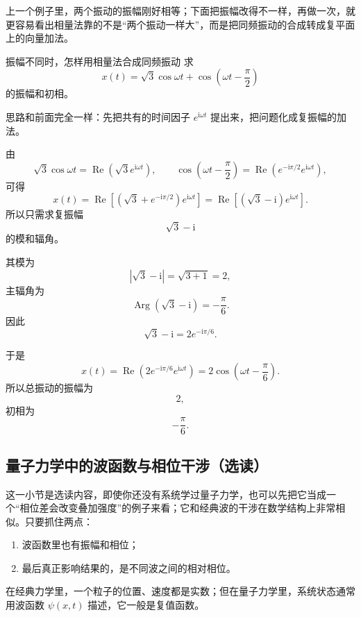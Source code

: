 \noindent 上一个例子里，两个振动的振幅刚好相等；下面把振幅改得不一样，再做一次，就更容易看出相量法靠的不是``两个振动一样大''，而是把同频振动的合成转成复平面上的向量加法。

\begin{lizi}{振幅不同时，怎样用相量法合成同频振动}{}
求
\[
x(t)=\sqrt{3}\cos\omega t+\cos\left(\omega t-\frac{\pi}{2}\right)
\]
的振幅和初相。

\begin{jie}
思路和前面完全一样：先把共有的时间因子 $e^{\mathrm{i}\omega t}$ 提出来，把问题化成复振幅的加法。

由
\[
\sqrt{3}\cos\omega t=\operatorname{Re}\left(\sqrt{3}e^{\mathrm{i}\omega t}\right),\qquad
\cos\left(\omega t-\frac{\pi}{2}\right)=\operatorname{Re}\left(e^{-\mathrm{i}\pi/2}e^{\mathrm{i}\omega t}\right),
\]
可得
\[
x(t)=\operatorname{Re}\left[\left(\sqrt{3}+e^{-\mathrm{i}\pi/2}\right)e^{\mathrm{i}\omega t}\right]
=\operatorname{Re}\left[(\sqrt{3}-\mathrm{i})e^{\mathrm{i}\omega t}\right].
\]
所以只需求复振幅
\[
\sqrt{3}-\mathrm{i}
\]
的模和辐角。

其模为
\[
|\sqrt{3}-\mathrm{i}|=\sqrt{3+1}=2,
\]
主辐角为
\[
\operatorname{Arg}(\sqrt{3}-\mathrm{i})=-\frac{\pi}{6}.
\]
因此
\[
\sqrt{3}-\mathrm{i}=2e^{-\mathrm{i}\pi/6}.
\]

于是
\[
x(t)=\operatorname{Re}\left(2e^{-\mathrm{i}\pi/6}e^{\mathrm{i}\omega t}\right)
=2\cos\left(\omega t-\frac{\pi}{6}\right).
\]
所以总振动的振幅为
\[
2,
\]
初相为
\[
-\frac{\pi}{6}.
\]
\end{jie}
\end{lizi}

\subsection{量子力学中的波函数与相位干涉（选读）}

\begin{tishi}[阅读定位]
这一小节是选读内容，即使你还没有系统学过量子力学，也可以先把它当成一个``相位差会改变叠加强度''的例子来看；它和经典波的干涉在数学结构上非常相似。只要抓住两点：
\begin{enumerate}
    \item 波函数里也有振幅和相位；
    \item 最后真正影响结果的，是不同波之间的相对相位。
\end{enumerate}
\end{tishi}

在经典力学里，一个粒子的位置、速度都是实数；但在量子力学里，系统状态通常用波函数 $\psi(x,t)$ 描述，它一般是复值函数。


